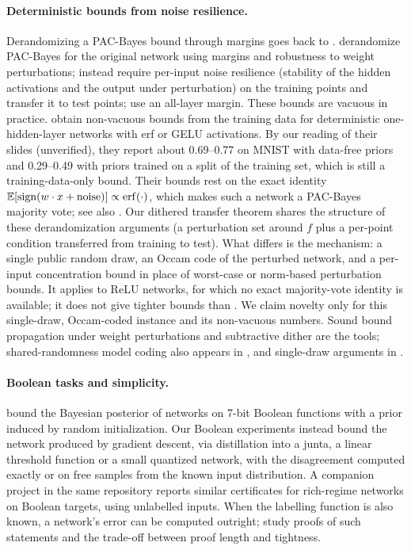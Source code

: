 \paragraph{Deterministic bounds from noise resilience.} Derandomizing a PAC-Bayes bound through margins goes back to \citet{langford2002pacbayes}. \citet{neyshabur2018pacbayes} derandomize PAC-Bayes for the original network using margins and robustness to weight perturbations; \citet{nagarajan2019deterministic} instead require per-input noise resilience (stability of the hidden activations and the output under perturbation) on the training points and transfer it to test points; \citet{wei2020improved} use an all-layer margin. These bounds are vacuous in practice. \citet{biggs2022nonvacuous} obtain non-vacuous bounds from the training data for deterministic one-hidden-layer networks with erf or GELU activations. By our reading of their slides (unverified), they report about 0.69--0.77 on MNIST with data-free priors and 0.29--0.49 with priors trained on a split of the training set, which is still a training-data-only bound. Their bounds rest on the exact identity $\mathbb{E}[\mathrm{sign}(w\cdot x+\text{noise})]\propto\mathrm{erf}(\cdot)$, which makes such a network a PAC-Bayes majority vote; see also \citet{biggs2022margins}. Our dithered transfer theorem shares the structure of these derandomization arguments (a perturbation set around $f$ plus a per-point condition transferred from training to test). What differs is the mechanism: a single public random draw, an Occam code of the perturbed network, and a per-input concentration bound in place of worst-case or norm-based perturbation bounds. It applies to ReLU networks, for which no exact majority-vote identity is available; it does not give tighter bounds than \citet{biggs2022nonvacuous}. We claim novelty only for this single-draw, Occam-coded instance and its non-vacuous numbers. Sound bound propagation under weight perturbations \cite{xu2020automatic} and subtractive dither \cite{schuchman1964dither} are the tools; shared-randomness model coding also appears in \citet{havasi2019minimal}, and single-draw arguments in \citet{blanchard2007occam}.

\paragraph{Boolean tasks and simplicity.} \citet{valleperez2019deep} bound the Bayesian posterior of networks on 7-bit Boolean functions with a prior induced by random initialization. Our Boolean experiments instead bound the network produced by gradient descent, via distillation into a junta, a linear threshold function or a small quantized network, with the disagreement computed exactly or on free samples from the known input distribution. A companion project in the same repository \cite{gdcircuit2026} reports similar certificates for rich-regime networks on Boolean targets, using unlabelled inputs. When the labelling function is also known, a network's error can be computed outright; \citet{gross2024compact} study proofs of such statements and the trade-off between proof length and tightness.

